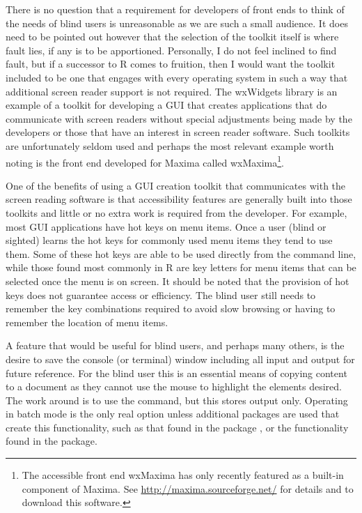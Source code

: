There is no question that a requirement for developers of front ends to think of the needs of blind users is unreasonable as we are such a small audience. It does need to be pointed out however that the selection of the toolkit itself is where fault lies, if any is to be apportioned. Personally, I do not feel inclined to find fault, but if a successor to R comes to fruition, then I would want the toolkit included to be one that engages with every operating system in such a way that additional screen reader support is not required. The wxWidgets library \citep{WXWidgets} is an example of a toolkit for developing a GUI that creates applications that do communicate with screen readers without special adjustments being made by the developers or those that have an interest in screen reader software. Such toolkits are unfortunately seldom used and perhaps the most relevant example worth noting is the front end developed for Maxima \citep{Maxima} called wxMaxima\footnote{The accessible front end wxMaxima has only recently featured as a built-in component of Maxima. See \url{http://maxima.sourceforge.net/} for details and to download this software.}.
 
One of the benefits of using a GUI creation toolkit that communicates with the screen reading software is that accessibility features are generally built into those toolkits and little or no extra work is required from the developer. For example, most GUI applications have hot keys on menu items. Once a user (blind or sighted) learns the hot keys for commonly used menu items they tend to use them. Some of these hot keys are able to be used directly from the command line, while those found most commonly in R are key letters for menu items that can be selected once the menu is on screen. It should be noted that the provision of hot keys does not guarantee access or efficiency. The blind user still needs to remember the key combinations required to avoid slow browsing or having to remember  the location of menu items. 

A feature that would be useful for blind users, and perhaps many others, is the desire to save the console (or terminal) window including all input and output for future reference. For the blind user this is an essential means of copying content to a document as they cannot use the mouse to highlight the elements desired. The work around is to use the  command, but this stores output only. Operating in batch mode is the only real option unless additional packages are used that create this functionality, such as that found in the  package \citep{TeachingDemos}, 
or the  functionality found in the  package.

